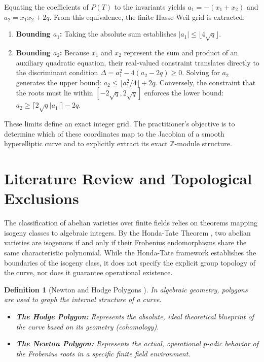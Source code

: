 \documentclass[11pt,letterpaper]{article}
\newtheorem{definition}[theorem]{Definition}
\begin{document}
Equating the coefficients of $P(T)$ to the invariants yields $a_1 = -(x_1 + x_2)$ and $a_2 = x_1 x_2 + 2q$. From this equivalence, the finite Hasse-Weil grid is extracted:
\begin{enumerate}
\item \textbf{Bounding $a_1$:} Taking the absolute sum establishes $|a_1| \le \lfloor 4\sqrt{q} \rfloor$.
\item \textbf{Bounding $a_2$:} Because $x_1$ and $x_2$ represent the sum and product of an auxiliary quadratic equation, their real-valued constraint translates directly to the discriminant condition $\Delta = a_1^2 - 4(a_2 - 2q) \ge 0$. Solving for $a_2$ generates the upper bound: $a_2 \le \lfloor a_1^2/4 \rfloor + 2q$. Conversely, the constraint that the roots must lie within $[-2\sqrt{q}, 2\sqrt{q}]$ enforces the lower bound: $a_2 \ge \lceil 2\sqrt{q}|a_1| \rceil - 2q$.
\end{enumerate}
These limits define an exact integer grid. The practitioner's objective is to determine which of these coordinates map to the Jacobian of a smooth hyperelliptic curve and to explicitly extract its exact $\mathbb{Z}$-module structure.

\section{Literature Review and Topological Exclusions}
The classification of abelian varieties over finite fields relies on theorems mapping isogeny classes to algebraic integers. By the Honda-Tate Theorem \cite{Honda1968, Tate1966}, two abelian varieties are isogenous if and only if their Frobenius endomorphisms share the same characteristic polynomial. While the Honda-Tate framework establishes the boundaries of the isogeny class, it does not specify the explicit group topology of the curve, nor does it guarantee operational existence.

\begin{definition}[Newton and Hodge Polygons \cite{Katz1979, Waterhouse1969}]
In algebraic geometry, polygons are used to graph the internal structure of a curve. 
\begin{itemize}
    \item \textbf{The Hodge Polygon:} Represents the absolute, ideal theoretical blueprint of the curve based on its geometry (cohomology).
    \item \textbf{The Newton Polygon:} Represents the actual, operational $p$-adic behavior of the Frobenius roots in a specific finite field environment.
\end{itemize}
\end{definition}
\end{document}
